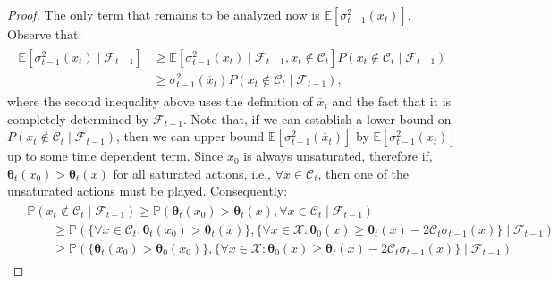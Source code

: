 \documentclass[final,12pt]{colt2026} %
\begin{document}
\begin{proof}
The only term that remains to be analyzed now is $\mathbb{E} \left[ \sigma_{t-1}^2(\overline{x}_t)\right]$. Observe that:
\begin{align}\label{eq:GB5}
\begin{split}
    \mathbb{E} \left[ \sigma_{t-1}^2(x_t)\mid \mathcal{F}_{t-1}\right] &\geq  \mathbb{E} \left[ \sigma_{t-1}^2(x_t)\mid \mathcal{F}_{t-1}, x_t \notin \mathcal{C}_t\right] P(x_t \notin \mathcal{C}_t\mid \mathcal{F}_{t-1} )\\
    &\geq \sigma_{t-1}^2(\overline{x}_t) P(x_t \notin \mathcal{C}_t \mid \mathcal{F}_{t-1} ),
\end{split}
\end{align}
where the second inequality above uses the definition of $\overline{x}_t$ and the fact that it is completely determined by $\mathcal{F}_{t-1}$.
Note that, if we can establish a lower bound on  $P(x_t \notin \mathcal{C}_t \mid \mathcal{F}_{t-1} )$, then we can upper bound $\mathbb{E} \left[ \sigma_{t-1}^2(\overline{x}_t)\right]$ by $\mathbb{E} \left[ \sigma_{t-1}^2(x_t)\right]$ up to some time dependent term. 
Since $x_0$ is always unsaturated, therefore if, $\pmb \theta_t(x_0) > \pmb \theta_t(x)$ for all saturated actions, i.e., $ \forall x\in \mathcal{C}_t$, then one of the unsaturated actions must be played. Consequently:
\begin{align}\label{eq:eqLB2}
\begin{split}
    &\mathbb{P}(x_t \notin \mathcal{C}_t\mid \mathcal{F}_{t-1} ) \geq \mathbb{P}( \pmb \theta_t(x_0) > \pmb \theta_t(x), \forall x\in \mathcal{C}_t \mid \mathcal{F}_{t-1} )\\
    &\qquad \geq  \mathbb{P}( \{ \forall x\in \mathcal{C}_t: \pmb \theta_t(x_0) > \pmb \theta_t(x) \} , \{\forall x\in \mathcal X: \pmb \theta_0(x) \geq \pmb \theta_t(x) -  2 \mathcal{C}_t \sigma_{t-1}(x)\} \mid \mathcal{F}_{t-1} ) 
    \\
    &\qquad \geq  \mathbb{P}( \{  \pmb \theta_t(x_0) > \pmb \theta_0(x_0)   \}  , \{\forall x\in \mathcal X: \pmb \theta_0(x) \geq \pmb \theta_t(x) - 2 \mathcal{C}_t \sigma_{t-1}(x)\} \mid \mathcal{F}_{t-1} )

\end{split}
\end{align}
\end{proof}
\end{document}
